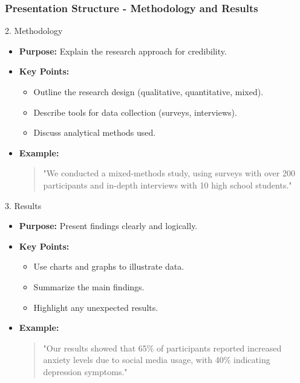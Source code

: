 \documentclass[aspectratio=169]{beamer}
\begin{document}
\begin{frame}[fragile]
    \frametitle{Presentation Structure - Methodology and Results}
    \begin{block}{2. Methodology}
        \begin{itemize}
            \item \textbf{Purpose:} Explain the research approach for credibility.
            \item \textbf{Key Points:}
                \begin{itemize}
                    \item Outline the research design (qualitative, quantitative, mixed).
                    \item Describe tools for data collection (surveys, interviews).
                    \item Discuss analytical methods used.
                \end{itemize}
            \item \textbf{Example:} 
                \begin{quote}
                    "We conducted a mixed-methods study, using surveys with over 200 participants and in-depth interviews with 10 high school students."
                \end{quote}
        \end{itemize}
    \end{block}
    
    \begin{block}{3. Results}
        \begin{itemize}
            \item \textbf{Purpose:} Present findings clearly and logically.
            \item \textbf{Key Points:}
                \begin{itemize}
                    \item Use charts and graphs to illustrate data.
                    \item Summarize the main findings.
                    \item Highlight any unexpected results.
                \end{itemize}
            \item \textbf{Example:} 
                \begin{quote}
                    "Our results showed that 65\% of participants reported increased anxiety levels due to social media usage, with 40\% indicating depression symptoms."
                \end{quote}
        \end{itemize}
    \end{block}
\end{frame}
\end{document}
